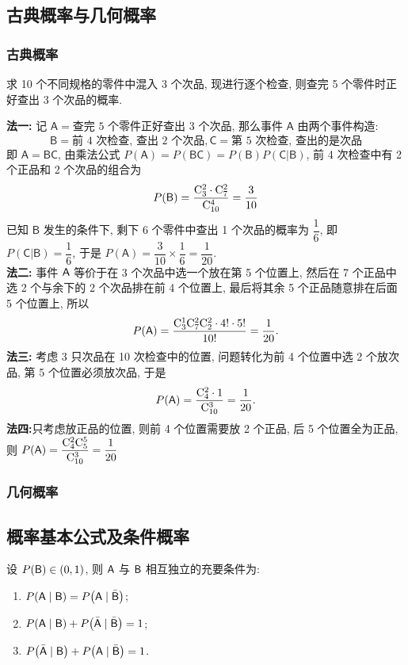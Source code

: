 \subsection{古典概率与几何概率}

\subsubsection{古典概率}

\begin{example}
    求 10 个不同规格的零件中混入 3 个次品, 现进行逐个检查, 则查完 5 个零件时正好查出 3 个次品的概率.
\end{example}
\begin{solution}
    \textbf{法一: }记 $\mathsf{A}=\text{查完 5 个零件正好查出 3 个次品}$, 那么事件 $\mathsf{A}$ 由两个事件构造: $$\mathsf{B}=\text{前 4 次检查, 查出 2 个次品},\mathsf{C}=\text{第 5 次检查, 查出的是次品}$$
    即 $\mathsf{A}=\mathsf{BC}$, 由乘法公式 $P(\mathsf{A})=P(\mathsf{BC})=P(\mathsf{B})P(\mathsf{C}|\mathsf{B})$, 前 4 次检查中有 2 个正品和 2 个次品的组合为
    $$P(\mathsf{B})=\dfrac{\mathrm{C}_3^2\cdot\mathrm{C}_7^2}{\mathrm{C}_{10}^4}=\dfrac{3}{10}$$
    已知 $\mathsf{B}$ 发生的条件下, 剩下 6 个零件中查出 1 个次品的概率为 $\dfrac{1}{6}$, 即 $P(\mathsf{C}|\mathsf{B})=\dfrac{1}{6}$, 于是 $P(\mathsf{A})=\dfrac{3}{10}\times\dfrac{1}{6}=\dfrac{1}{20}.$\\
    \textbf{法二: }事件 $\mathsf{A}$ 等价于在 3 个次品中选一个放在第 5 个位置上, 然后在 7 个正品中选 2 个与余下的 2 个次品排在前 4 个位置上, 最后将其余 5 个正品随意排在后面 5 个位置上, 所以
    $$P(\mathsf{A})=\dfrac{\mathrm{C}_3^1\mathrm{C}_7^2\mathrm{C}_2^2\cdot 4!\cdot5!}{10!}=\dfrac{1}{20}.$$
    \textbf{法三: }考虑 3 只次品在 10 次检查中的位置, 问题转化为前 4 个位置中选 2 个放次品, 第 5 个位置必须放次品, 于是 $$P(\mathsf{A})=\dfrac{\mathrm{C}_4^2\cdot1}{\mathrm{C}_{10}^3}=\dfrac{1}{20}.$$
    \textbf{法四:}只考虑放正品的位置, 则前 4 个位置需要放 2 个正品, 后 5 个位置全为正品, 则 $P(\mathsf{A})=\dfrac{\mathrm{C}_4^2\mathrm{C}_5^5}{\mathrm{C}_{10}^3}=\dfrac{1}{20}$
\end{solution}

\subsubsection{几何概率}

\subsection{概率基本公式及条件概率}

\begin{theorem}[与独立有关的条件概率]
    设 $P(\mathsf{B})\in(0,1)$, 则 $\mathsf{A} $ 与 $\mathsf{B}$ 相互独立的充要条件为:
    \begin{enumerate}[label=(\arabic{*})]
        \item $P(\mathsf{A}\mid\mathsf{B})=P\qty(\mathsf{A}\mid \bar{\mathsf{B}})$;
        \item $P(\mathsf{A}\mid\mathsf{B})+P\qty(\bar{\mathsf{A}}\mid \bar{\mathsf{B}})=1$;
        \item $P\qty(\bar{\mathsf{A}}\mid \mathsf{B})+P\qty(\mathsf{A}\mid \bar{\mathsf{B}})=1$.
    \end{enumerate}
\end{theorem}


